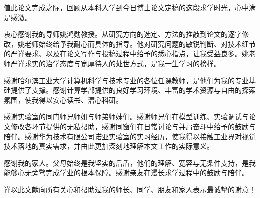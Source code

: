 \begin{acknowledgements}
值此论文完成之际，回顾从本科入学到今日博士论文定稿的这段求学时光，心中满是感激。

衷心感谢我的导师姚鸿勋教授。从研究方向的选定、方法的推敲到论文的逐字修改，姚老师始终给予我耐心而具体的指导。他对研究问题的敏锐判断、对技术细节的严谨要求、以及在论文写作与投稿过程中给予的悉心指点，让我受益良多。姚老师严谨求实的治学态度与宽厚待人的处世方式，是我一生学习的榜样。

感谢哈尔滨工业大学计算机科学与技术专业的各位任课教师，是他们为我的专业基础提供了支撑。感谢计算学部提供的良好学习环境、丰富的学术资源与自由的探索氛围，使我得以安心读书、潜心科研。

感谢实验室的同门师兄师姐与师弟师妹们。感谢师兄们在模型训练、实验调试与论文修改各环节提供的无私帮助，感谢同窗们在日常讨论与并肩奋斗中给予的鼓励与陪伴。感谢华为技术有限公司诺亚实验室的实习经历，使我得以接触工业界对视觉技术落地的真实需求，并由此更加深刻地理解本文工作的实际意义。

感谢我的家人。父母始终是我坚实的后盾，他们的理解、宽容与无条件支持，是我能够心无旁骛完成学业的根本保障。感谢亲友在漫长求学过程中的鼓励与陪伴。


谨以此文献向所有关心和帮助过我的师长、同学、朋友和家人表示最诚挚的谢意！
\end{acknowledgements}
